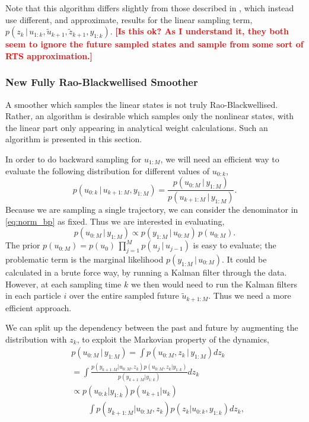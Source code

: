 \documentclass[twocolumn]{autart}    %
\newcommand{\comment}[1]{\textcolor{red}{\textbf{[#1]}}}
\begin{document}
Note that this algorithm differs slightly from those described in \cite{Fong+Godsill+Doucet+West:2002,Lindsten+Schon:2011}, which instead use different, and approximate, results for the linear sampling term, $p(z_k\,|\, u_{1:k}, \tilde{u}_{k+1}, \tilde{z}_{k+1},y_{1:k})$. \comment{Is this ok? As I understand it, they both seem to ignore the future sampled states and sample from some sort of RTS approximation.}



\subsubsection{New Fully Rao-Blackwellised Smoother}

A smoother which samples the linear states is not truly Rao-Blackwellised. Rather, an algorithm is desirable which samples only the nonlinear states, with the linear part only appearing in analytical weight calculations. Such an algorithm is presented in this section.

In order to do backward sampling for $u_{1:M}$, we will need an efficient way to evaluate the following distribution for different values of $u_{0:k}$,
%
\begin{equation}
  p(u_{0:k}\,|\,u_{k+1:M},y_{1:M})
  = \frac{p(u_{0:M}\,|\,y_{1:M})}{p(u_{k+1:M}\,|\,y_{1:M})}.
\label{eq:norm_bp}
\end{equation}
%
Because we are sampling a single trajectory, we can consider the denominator in \eqref{eq:norm_bp} as fixed. Thus we are interested in
evaluating,
%
\begin{equation}
  p(u_{0:M}\,|\,y_{1:M}) \propto p(y_{1:M}\,|\,u_{0:M}) \, p(u_{0:M}).
\end{equation}
%
The prior $p(u_{0:M}) = p(u_0) \, \prod_{j=1}^M p(u_{j}\,|\,u_{j-1})$ is easy to evaluate; the problematic term is the marginal likelihood $p(y_{1:M}\,|\,u_{0:M})$. It could be calculated in a brute force way, by running a Kalman filter through the data.  However, at each sampling time $k$ we then would need to run the Kalman filters in each particle $i$ over the entire sampled future $\tilde{u}_{k+1:M}$. Thus we need a more efficient approach.

We can split up the dependency between the past and future by augmenting the distribution with $z_k$, to exploit the Markovian property of the dynamics,
%
\begin{equation}
\begin{split}
  & p(u_{0:M}\,|\,y_{1:M}) = \int p(u_{0:M}, z_k \,|\,y_{1:M}) dz_k \\
  &= \int \frac{ p(y_{k+1:M} | u_{0:M}, z_k) p(u_{0:M}, z_k | y_{1:k}) }{ p(y_{k+1:M} | y_{1:k}) } dz_k \\
  &\propto p(u_{0:k} | y_{1:k}) p(u_{k+1} | u_{k}) \\
  & \qquad \int p(y_{k+1:M} | u_{0:M}, z_k) p(z_k | u_{0:k}, y_{1:k}) dz_k    ,
\end{split}
\label{eq:split}
\end{equation}
\end{document}
